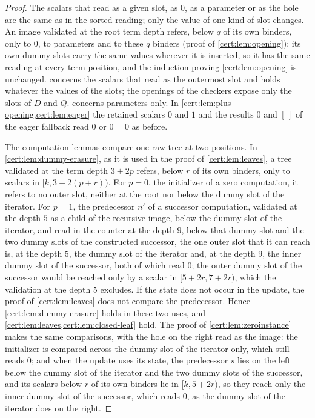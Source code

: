 \begin{proof}
The scalars that read as a given slot, as $0$, as a parameter or as the hole are the
same as in the sorted reading; only the value of one kind of slot changes. An image
validated at the root term depth refers, below $q$ of its own binders, only to $0$,
to parameters and to these $q$ binders (proof of \cref{cert:lem:opening}); its own
dummy slots carry the same values wherever it is inserted, so it has the same reading
at every term position, and the induction proving \cref{cert:lem:opening} is
unchanged.  concerns the scalars that read as the outermost
slot and holds whatever the values of the slots; the openings of the checkers expose
only the slots of $D$ and $Q$.  concerns parameters only. In
\cref{cert:lem:plus-opening,cert:lem:eager} the retained scalars $0$ and $1$ and the
results $0$ and $[\,]$ of the eager fallback read $0$ or $0=0$ as before.

The computation lemmas compare one raw tree at two positions. In
\cref{cert:lem:dummy-erasure}, as it is used in the proof of \cref{cert:lem:leaves},
a tree validated at the term depth $3+2p$ refers, below $r$ of its own binders, only to
scalars in $[k,3+2(p+r))$. For $p=0$, the initializer of a zero computation, it
refers to no outer slot, neither at the root nor below the dummy slot of the
iterator. For $p=1$, the predecessor $n'$ of a successor computation, validated at the
depth $5$ as a child of the recursive image, below the dummy slot of the iterator,
and read in the counter at the depth $9$, below that dummy slot and the two dummy
slots of the constructed successor, the one outer slot that it can reach is, at the
depth $5$, the dummy slot of the iterator and, at the depth $9$, the inner dummy slot
of the successor, both of which read $0$; the outer dummy slot of the successor would
be reached only by a scalar in $[5+2r,7+2r)$, which the validation at the depth $5$
excludes. If the state does not occur in the update, the proof of
\cref{cert:lem:leaves} does not compare the predecessor. Hence
\cref{cert:lem:dummy-erasure} holds in these two uses, and
\cref{cert:lem:leaves,cert:lem:closed-leaf} hold. The proof of
\cref{cert:lem:zeroinstance} makes the same comparisons, with the hole on the right
read as the image: the initializer is compared across the dummy slot of the iterator
only, which still reads $0$; and when the update uses its state, the predecessor $s$
lies on the left below the dummy slot of the iterator and the two dummy slots of the
successor, and its scalars below $r$ of its own binders lie in $[k,5+2r)$, so they
reach only the inner dummy slot of the successor, which reads $0$, as the dummy slot of
the iterator does on the right.


\end{proof}
